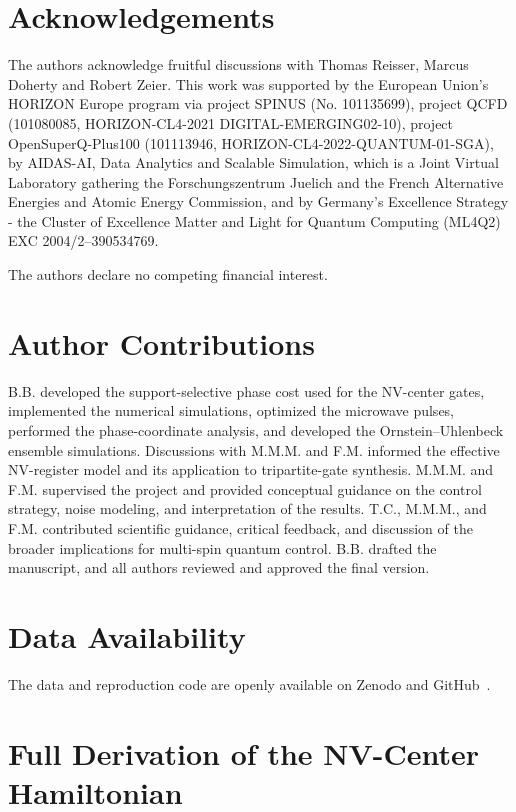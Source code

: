 \documentclass[
  aps,
  pra,
  reprint,            %
  superscriptaddress, %
  amsmath,amssymb,
  notitlepage
]{revtex4-2}
\begin{document}
\section*{Acknowledgements}
\noindent
The authors acknowledge fruitful discussions with Thomas Reisser, Marcus Doherty and Robert Zeier. This work was supported by the European Union’s HORIZON Europe program via project SPINUS (No. 101135699), project QCFD (101080085, HORIZON-CL4-2021 DIGITAL-EMERGING02-10), project OpenSuperQ-Plus100 (101113946, HORIZON-CL4-2022-QUANTUM-01-SGA), by AIDAS-AI, Data Analytics and Scalable Simulation, which is a Joint Virtual Laboratory gathering the Forschungszentrum Juelich and the French Alternative Energies and Atomic Energy Commission, and by Germany’s Excellence Strategy - the Cluster of Excellence Matter and Light for Quantum Computing (ML4Q2) EXC 2004/2–390534769.

\noindent
The authors declare no competing financial interest.

\section*{Author Contributions}
\noindent
B.B. developed the support-selective phase cost used for the NV-center gates, implemented the numerical simulations, optimized the microwave pulses, performed the phase-coordinate analysis, and developed the Ornstein--Uhlenbeck ensemble simulations. Discussions with M.M.M. and F.M. informed the effective NV-register model and its application to tripartite-gate synthesis. M.M.M. and F.M. supervised the project and provided conceptual guidance on the control strategy, noise modeling, and interpretation of the results. T.C., M.M.M., and F.M. contributed scientific guidance, critical feedback, and discussion of the broader implications for multi-spin quantum control. B.B. drafted the manuscript, and all authors reviewed and approved the final version.

\section*{Data Availability}
\noindent
The data and reproduction code are openly available on Zenodo and GitHub~\cite{baran2026_multiqubit_control}.

\appendix

\section{Full Derivation of the NV-Center Hamiltonian}
\label{app:nv_model}
\end{document}
